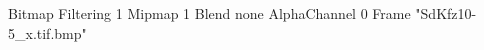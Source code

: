 {Bitmap
	{Filtering 1}
	{Mipmap 1}
	{Blend none}
	{AlphaChannel 0}
	{Frame "SdKfz10-5_x.tif.bmp"}
}
